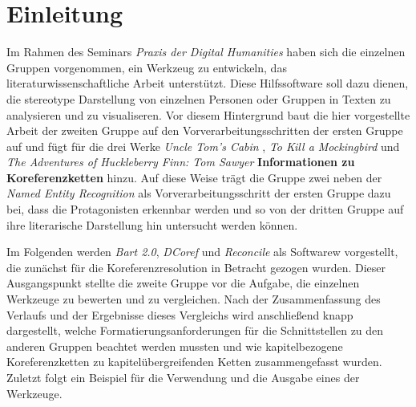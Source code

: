 \documentclass[a4paper,12pt,titlepage=true, ngerman]{scrartcl}
\begin{document}



\newpage

\listoffigures



\newpage

\listoftables


\newpage
{}

\section{Einleitung}\label{Einleitung} %

Im Rahmen des Seminars \emph{Praxis der Digital Humanities} haben sich die einzelnen Gruppen vorgenommen, 
ein Werkzeug zu entwickeln, das literaturwissenschaftliche Arbeit unterstützt. 
Diese Hilfssoftware soll dazu dienen, die stereotype Darstellung von einzelnen Personen oder Gruppen in Texten zu analysieren 
und zu visualiseren. 
Vor diesem Hintergrund baut die hier vorgestellte Arbeit der zweiten Gruppe auf den Vorverarbeitungsschritten der ersten Gruppe auf 
und fügt für die drei Werke \emph{Uncle Tom's Cabin}  \autocite[]{chris_uncle}, 
\emph{To Kill a Mockingbird}  \autocite[]{chris_bird} und 
\emph{The Adventures of Huckleberry Finn: Tom Sawyer} \autocite[]{chris_adventures} \textbf{Informationen zu Koreferenzketten} hinzu. 
Auf diese Weise trägt die Gruppe zwei neben der \emph{Named Entity Recognition} als Vorverarbeitungsschritt der ersten Gruppe dazu bei, 
dass die Protagonisten erkennbar werden und so von der dritten Gruppe auf ihre literarische Darstellung hin untersucht werden können.

Im Folgenden werden \emph{Bart 2.0}, \emph{DCoref} und \emph{Reconcile} als Softwarew vorgestellt, 
die zunächst für die Koreferenzresolution in Betracht gezogen wurden. 
Dieser Ausgangspunkt stellte die zweite Gruppe vor die Aufgabe, die einzelnen Werkzeuge zu bewerten und zu vergleichen. 
Nach der Zusammenfassung des Verlaufs und der Ergebnisse dieses Vergleichs wird anschließend knapp dargestellt, 
welche Formatierungsanforderungen für die Schnittstellen zu den anderen Gruppen beachtet werden mussten 
und wie kapitelbezogene Koreferenzketten zu kapitelübergreifenden Ketten zusammengefasst wurden. 
Zuletzt folgt ein Beispiel für die Verwendung und die Ausgabe eines der Werkzeuge.
\end{document}
